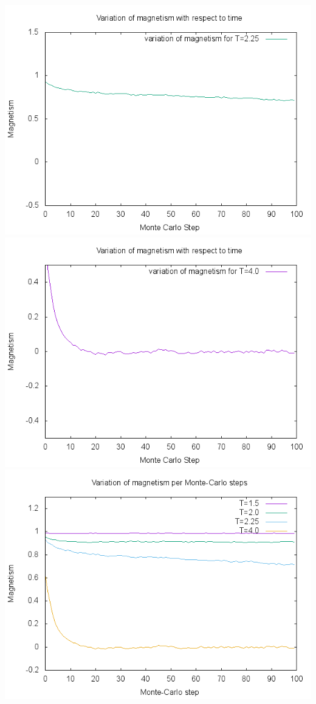 \documentclass[a4paper,12pt]{article}
\begin{document}
\begin{center}
\includegraphics[scale=.8]{225.png}
\includegraphics[scale=.8]{40.png}
\includegraphics[scale=.8]{0.png}
\end{center}
\end{document}
